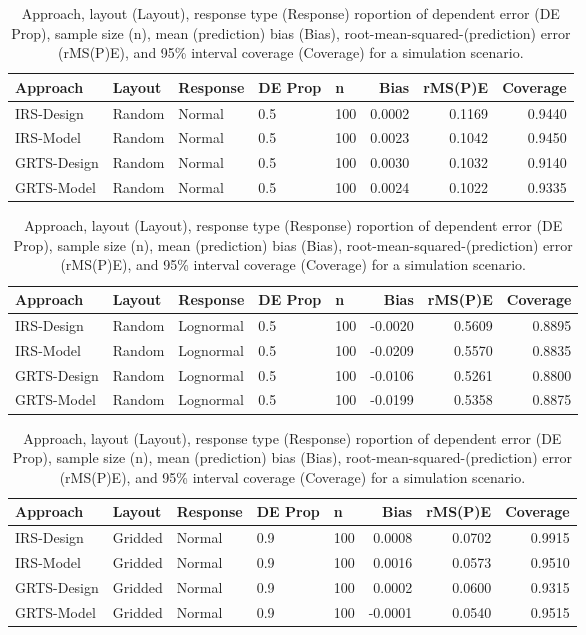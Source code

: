 \documentclass[]{elsarticle} %
\begin{document}
\begin{table}[ht]
\centering
\begin{tabular}{lllllrrr}
  \hline
Approach & Layout & Response & DE Prop & n & Bias & rMS(P)E & Coverage \\ 
  \hline
IRS-Design & Random & Normal & 0.5 & 100 & 0.0002 & 0.1169 & 0.9440 \\ 
  IRS-Model & Random & Normal & 0.5 & 100 & 0.0023 & 0.1042 & 0.9450 \\ 
  GRTS-Design & Random & Normal & 0.5 & 100 & 0.0030 & 0.1032 & 0.9140 \\ 
  GRTS-Model & Random & Normal & 0.5 & 100 & 0.0024 & 0.1022 & 0.9335 \\ 
   \hline
\end{tabular}
\caption{Approach, layout (Layout), response type (Response) roportion of dependent error (DE Prop), sample size (n), mean (prediction) bias (Bias), root-mean-squared-(prediction) error (rMS(P)E), and 95\% interval coverage (Coverage) for a simulation scenario.} 
\end{table}
\begin{table}[ht]
\centering
\begin{tabular}{lllllrrr}
  \hline
Approach & Layout & Response & DE Prop & n & Bias & rMS(P)E & Coverage \\ 
  \hline
IRS-Design & Random & Lognormal & 0.5 & 100 & -0.0020 & 0.5609 & 0.8895 \\ 
  IRS-Model & Random & Lognormal & 0.5 & 100 & -0.0209 & 0.5570 & 0.8835 \\ 
  GRTS-Design & Random & Lognormal & 0.5 & 100 & -0.0106 & 0.5261 & 0.8800 \\ 
  GRTS-Model & Random & Lognormal & 0.5 & 100 & -0.0199 & 0.5358 & 0.8875 \\ 
   \hline
\end{tabular}
\caption{Approach, layout (Layout), response type (Response) roportion of dependent error (DE Prop), sample size (n), mean (prediction) bias (Bias), root-mean-squared-(prediction) error (rMS(P)E), and 95\% interval coverage (Coverage) for a simulation scenario.} 
\end{table}
\begin{table}[ht]
\centering
\begin{tabular}{lllllrrr}
  \hline
Approach & Layout & Response & DE Prop & n & Bias & rMS(P)E & Coverage \\ 
  \hline
IRS-Design & Gridded & Normal & 0.9 & 100 & 0.0008 & 0.0702 & 0.9915 \\ 
  IRS-Model & Gridded & Normal & 0.9 & 100 & 0.0016 & 0.0573 & 0.9510 \\ 
  GRTS-Design & Gridded & Normal & 0.9 & 100 & 0.0002 & 0.0600 & 0.9315 \\ 
  GRTS-Model & Gridded & Normal & 0.9 & 100 & -0.0001 & 0.0540 & 0.9515 \\ 
   \hline
\end{tabular}
\caption{Approach, layout (Layout), response type (Response) roportion of dependent error (DE Prop), sample size (n), mean (prediction) bias (Bias), root-mean-squared-(prediction) error (rMS(P)E), and 95\% interval coverage (Coverage) for a simulation scenario.} 
\end{table}
\end{document}
